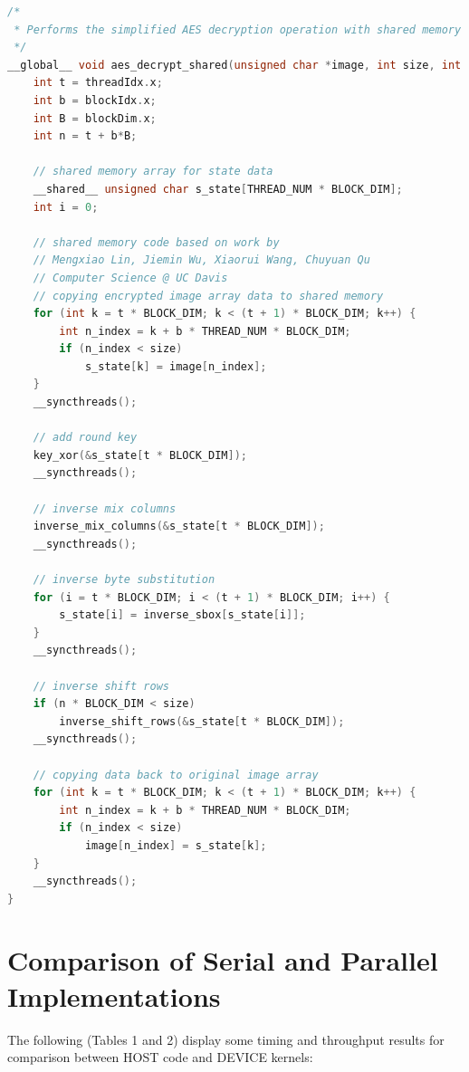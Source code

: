 \begin{shaded}
\begin{lstlisting}[language=C, caption={AES Decryption Kernel}]
/*
 * Performs the simplified AES decryption operation with shared memory
 */
__global__ void aes_decrypt_shared(unsigned char *image, int size, int key) {
    int t = threadIdx.x;
    int b = blockIdx.x;
    int B = blockDim.x;
    int n = t + b*B;

    // shared memory array for state data
    __shared__ unsigned char s_state[THREAD_NUM * BLOCK_DIM];
    int i = 0;

    // shared memory code based on work by 
    // Mengxiao Lin, Jiemin Wu, Xiaorui Wang, Chuyuan Qu 
    // Computer Science @ UC Davis
    // copying encrypted image array data to shared memory
    for (int k = t * BLOCK_DIM; k < (t + 1) * BLOCK_DIM; k++) {
        int n_index = k + b * THREAD_NUM * BLOCK_DIM;
        if (n_index < size)
            s_state[k] = image[n_index];
    }
    __syncthreads();

    // add round key
    key_xor(&s_state[t * BLOCK_DIM]);
    __syncthreads();

    // inverse mix columns
    inverse_mix_columns(&s_state[t * BLOCK_DIM]);
    __syncthreads();

    // inverse byte substitution
    for (i = t * BLOCK_DIM; i < (t + 1) * BLOCK_DIM; i++) {
        s_state[i] = inverse_sbox[s_state[i]];
    }
    __syncthreads();

    // inverse shift rows
    if (n * BLOCK_DIM < size)
        inverse_shift_rows(&s_state[t * BLOCK_DIM]);
    __syncthreads();

    // copying data back to original image array
    for (int k = t * BLOCK_DIM; k < (t + 1) * BLOCK_DIM; k++) {
        int n_index = k + b * THREAD_NUM * BLOCK_DIM;
        if (n_index < size)
            image[n_index] = s_state[k];
    }
    __syncthreads();
}
\end{lstlisting} 
\end{shaded}

\section{Comparison of Serial and Parallel Implementations}

The following (Tables 1 and 2) display some timing and throughput results for comparison between HOST code and DEVICE kernels:

